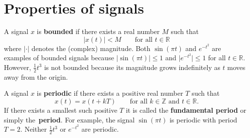 \documentclass[11pt,a4paper]{book}
\theoremstyle{plain}
\numberwithin{equation}{section}
\newcommand{\reals}{{\mathbb R}}
\newcommand{\ints}{{\mathbb Z}}
\newcommand{\term}{\textbf}
\newcommand{\sabs}[1]{\vert #1 \vert}
\begin{document}

\section{Properties of signals}\label{sec:properties-signals}

A signal $x$ is \term{bounded} if there exists a real number $M$ such that 
\[
\sabs{x(t)} < M \qquad \text{for all $t \in \reals$} 
\]
where $\sabs{\cdot}$ denotes the (complex) magnitude.  Both $\sin( \pi t)$ and $e^{-t^2}$ are examples of bounded signals because $\sabs{\sin( \pi t)} \leq 1$ and $\sabs{e^{-t^2}} \leq 1$ for all $t \in \reals$.  However, $\frac{1}{2}t^3$ is not bounded because its magnitude grows indefinitely as $t$ moves away from the origin.  %

A signal $x$ is \term{periodic} if there exists a positive real number $T$ such that
\[
x(t) = x(t + kT) \qquad \text{for all $k \in \ints$ and $t \in \reals$.}
\]
If there exists a smallest such positive $T$ it is called the \term{fundamental period} or simply the~\term{period}.  For example, the signal $\sin( \pi t)$ is periodic with period $T=2$.  Neither $\frac{1}{2}t^3$ or $e^{-t^2}$ are periodic.  %
\end{document}
